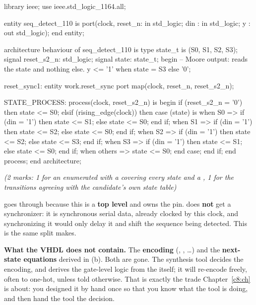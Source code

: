 \begin{vhdlcode}
library ieee;
use ieee.std_logic_1164.all;

entity seq_detect_110 is
    port(clock, reset_n: in  std_logic;
         din           : in  std_logic;
         y             : out std_logic);
end entity;

architecture behaviour of seq_detect_110 is
type state_t is (S0, S1, S2, S3);
signal reset_s2_n: std_logic;
signal state: state_t;
begin
    -- Moore output: reads the state and nothing else.
    y <= '1' when state = S3 else '0';

    reset_sync1: entity work.reset_sync
        port map(clock, reset_n, reset_s2_n);

    STATE_PROCESS: process(clock, reset_s2_n) is
    begin
        if (reset_s2_n = '0') then
            state <= S0;
        elsif (rising_edge(clock)) then
            case (state) is
                when S0 =>
                    if (din = '1') then state <= S1; else state <= S0; end if;
                when S1 =>
                    if (din = '1') then state <= S2; else state <= S0; end if;
                when S2 =>
                    if (din = '1') then state <= S2; else state <= S3; end if;
                when S3 =>
                    if (din = '1') then state <= S1; else state <= S0; end if;
                when others =>
                    state <= S0;
            end case;
        end if;
    end process;
end architecture;
\end{vhdlcode}

\noindent\textit{(2 marks: 1 for an enumerated  with a  covering every
state and a , 1 for the transitions agreeing with the candidate's own state
table)}

 goes through  because this is a \textbf{top level} and owns the pin.
 does \textbf{not} get a synchronizer: it is synchronous serial data, already clocked by
this clock, and synchronizing it would only delay it and shift the sequence being detected. This is
the same split  makes.

\textbf{What the VHDL does not contain.} The \textbf{encoding} (, ,
\dots) and the \textbf{next-state equations} derived in (b). Both are gone. The synthesis tool
decides the encoding, and derives the gate-level logic from the  itself; it will
re-encode freely, often to one-hot, unless told otherwise. That is exactly the trade
Chapter~\ref{c8:ch} is about: you designed it by hand once so that you know what the tool is doing,
and then hand the tool the decision. 


